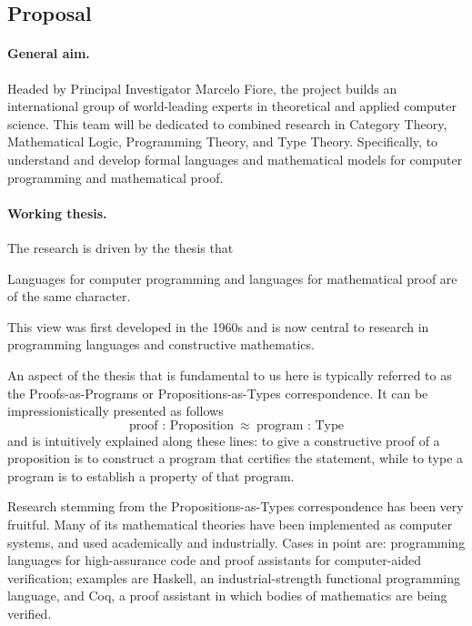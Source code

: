 \documentclass[11pt,twocolumn]{article}
\newenvironment{myquote}
  {\begin{list}{}
  {\setlength{\topsep}{2pt}
   \setlength{\partopsep}{2pt}
   \setlength{\itemsep}{2.5pt}
   \setlength{\parsep}{2.5pt}
   \setlength{\rightmargin}{1em}
   \setlength{\leftmargin}{1em}
   \setlength{\labelwidth}{.5em}}}
  {\end{list}}
\begin{document}
\clearpage
{}

\subsection{Proposal}
\label{Proposal}

\paragraph*{General aim.}

Headed by Principal Investigator Marcelo Fiore, the project builds an
international group of world-leading experts in theoretical and applied
computer science.  This team will be dedicated to combined research in
Category Theory, Mathematical Logic, Programming Theory, and Type Theory.
Specifically, to understand and develop formal languages and mathematical
models for computer programming and mathematical proof. 

\paragraph*{Working thesis.}

The research is driven by the thesis that
\begin{myquote}
\item
Languages for computer programming and languages for mathematical proof are of
the same character.
\end{myquote}
This view was first developed in the 1960s and is now central to research in
programming languages and constructive mathematics.

An aspect of the thesis that is fundamental to us here is typically referred
to as the Proofs-as-Programs or Propositions-as-Types correspondence.  It can
be impressionistically presented as follows
\[
  \mbox{proof : Proposition} 
  \enspace \approx \enspace 
  \mbox{program : Type} 
\]
and is intuitively explained along these lines: to give a constructive proof
of a proposition is to construct a program that certifies the statement, while
to type a program is to establish a property of that program.

Research stemming from the Propositions-as-Types correspondence has been very
fruitful.  Many of its mathematical theories have been implemented as computer
systems, and used academically and industrially.  Cases in point are:
programming languages for high-assurance code and proof assistants for
computer-aided verification; examples are Haskell, %
an industrial-strength functional programming language, and Coq, %
a proof assistant in which bodies of mathematics are being verified.
\end{document}
